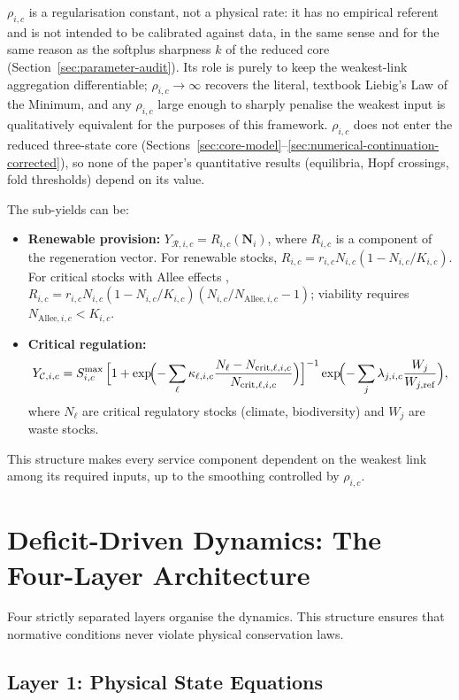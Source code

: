 \documentclass[twocolumn,10pt]{article}
\begin{document}
\(\rho_{i,c}\) is a regularisation constant, not a physical rate: it has no empirical referent and is not intended to be calibrated against data, in the same sense and for the same reason as the softplus sharpness $k$ of the reduced core (Section~\ref{sec:parameter-audit}). Its role is purely to keep the weakest-link aggregation differentiable; $\rho_{i,c}\to\infty$ recovers the literal, textbook Liebig's Law of the Minimum, and any $\rho_{i,c}$ large enough to sharply penalise the weakest input is qualitatively equivalent for the purposes of this framework. $\rho_{i,c}$ does not enter the reduced three-state core (Sections~\ref{sec:core-model}--\ref{sec:numerical-continuation-corrected}), so none of the paper's quantitative results (equilibria, Hopf crossings, fold thresholds) depend on its value.

The sub-yields can be:
\begin{itemize}
\item \textbf{Renewable provision:} \(Y_{\mathcal{R},i,c} = R_{i,c}(\mathbf{N}_i)\), where \(R_{i,c}\) is a component of the regeneration vector. For renewable stocks, \(R_{i,c} = r_{i,c} N_{i,c} (1 - N_{i,c}/K_{i,c})\).
      For critical stocks with Allee effects \cite{courchamp1999,kramer2009}, \(R_{i,c} = r_{i,c} N_{i,c} (1 - N_{i,c}/K_{i,c})
      (N_{i,c}/N_{\mathrm{Allee},i,c} - 1)\); viability requires \(N_{\mathrm{Allee},i,c} < K_{i,c}\).
\item \textbf{Critical regulation:}
      \[
      Y_{\mathcal{C},i,c} = S_{i,c}^{\max}\,
      \Bigl[1 + \exp\!\Bigl(-\sum_{\ell} \kappa_{\ell,i,c} \frac{N_{\ell} - N_{\mathrm{crit},\ell,i,c}}
      {N_{\mathrm{crit},\ell,i,c}}\Bigr)\Bigr]^{-1}
      \exp\!\Bigl(-\sum_{j} \lambda_{j,i,c} \frac{W_j}{W_{j,\mathrm{ref}}}\Bigr),
      \]
      where \(N_{\ell}\) are critical regulatory stocks (climate, biodiversity) and \(W_j\) are waste stocks.
\end{itemize}
This structure makes every service component dependent on the weakest link among its required inputs, up to the smoothing controlled by \(\rho_{i,c}\).

\section{Deficit-Driven Dynamics: The Four-Layer Architecture}
\label{sec:deficit-dynamics}
Four strictly separated layers organise the dynamics. This structure ensures that normative conditions never violate physical conservation laws.

\subsection{Layer 1: Physical State Equations}
\end{document}
